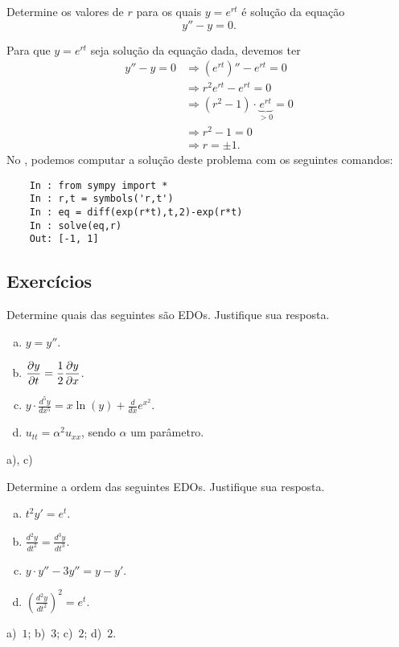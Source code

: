 \begin{exeresol}
  Determine os valores de $r$ para os quais $y = e^{rt}$ é solução da equação
  \begin{equation}
    y'' - y = 0.
  \end{equation}
\end{exeresol}
\begin{resol}
  Para que $y = e^{rt}$ seja solução da equação dada, devemos ter
  \begin{align}
    y'' - y = 0 &\Rightarrow \left(e^{rt}\right)'' - e^{rt} = 0 \\
    &\Rightarrow r^2e^{rt} - e^{rt} = 0 \\
    &\Rightarrow (r^2 - 1)\cdot \underbrace{e^{rt}}_{>0} = 0\\
    &\Rightarrow r^2 - 1 = 0 \\
    &\Rightarrow r = \pm 1.
  \end{align}
  \ifispython
  No \python, podemos computar a solução deste problema com os seguintes comandos:
  \begin{lstlisting}
    In : from sympy import *
    In : r,t = symbols('r,t')
    In : eq = diff(exp(r*t),t,2)-exp(r*t)
    In : solve(eq,r)
    Out: [-1, 1]
  \end{lstlisting}
  \fi
\end{resol}

\subsection*{Exercícios}

\begin{exer}
  Determine quais das seguintes são EDOs. Justifique sua resposta.
  \begin{enumerate}[a)]
  \item $\displaystyle y = y''$.
  \item $\displaystyle \frac{\partial y}{\partial t} = \frac{1}{2}\frac{\partial y}{\partial x}$.
  \item $\displaystyle y\cdot \frac{d^5y}{dx^5} = x\ln(y) + \frac{d}{dx}e^{x^2}$.
  \item $u_{tt} = \alpha^2u_{xx}$, sendo $\alpha$ um parâmetro.
  \end{enumerate}
\end{exer}
\begin{resp}
  a), c)
\end{resp}

\begin{exer}\label{exer:edo_ordem}
  Determine a ordem das seguintes EDOs. Justifique sua resposta.
  \begin{enumerate}[a)]
  \item $\displaystyle t^2y' = e^{t}$.
  \item $\displaystyle \frac{d^2y}{dt^2} = \frac{d^3y}{dt^3}$.
  \item $\displaystyle y\cdot y'' - 3y'' = y - y'$.
  \item $\displaystyle \left(\frac{d^2y}{dt^2}\right)^2 = e^t$.
  \end{enumerate}
\end{exer}
\begin{resp}
  a)~$1$; b)~$3$; c)~$2$; d)~$2$.
\end{resp}

